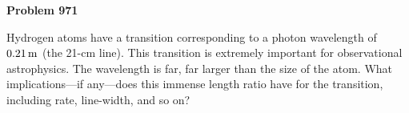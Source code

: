 \documentclass[12pt]{article}
\begin{document}
\begin{pottproblem}
\textbf{Problem 971}

Hydrogen atoms have a transition corresponding to a photon wavelength of $0.21\,\mathrm{m}$ (the 21-cm line).
This transition is extremely important for observational astrophysics.
The wavelength is far, far larger than the size of the atom.
What implications---if any---does this immense length ratio
have for the transition, including rate, line-width, and so on?

\end{pottproblem}
\end{document}
